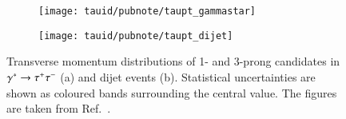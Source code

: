 \begin{figure}[htbp]
  \begin{subfigure}{0.498\textwidth}
    \texttt{[image: tauid/pubnote/taupt\_gammastar]}
    \label{fig:tauid_candidate_pt_gammastar}
  \end{subfigure}\hfill%
  \begin{subfigure}{0.498\textwidth}
    \texttt{[image: tauid/pubnote/taupt\_dijet]}
    \label{fig:tauid_candidate_pt_dijet}
  \end{subfigure}

  \caption{Transverse momentum distributions of 1- and 3-prong
    \tauhadvis candidates in $\gamma^{*} \to \tau^{+} \tau^{-}$ (a) and dijet
    events (b). Statistical uncertainties are shown as coloured bands
    surrounding the central value. The figures are taken from
    Ref.~\cite{ATL-PHYS-PUB-2019-033}.}%
  \label{fig:tauid_candidate_pt}
\end{figure}


